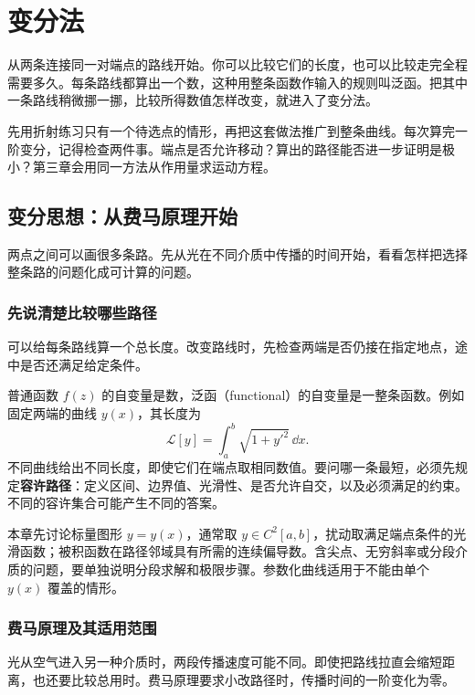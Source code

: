 \chapter{变分法}\label{ch:variation}

\begin{guidebox}
从两条连接同一对端点的路线开始。你可以比较它们的长度，也可以比较走完全程需要多久。每条路线都算出一个数，这种用整条函数作输入的规则叫泛函。把其中一条路线稍微挪一挪，比较所得数值怎样改变，就进入了变分法。

先用折射练习只有一个待选点的情形，再把这套做法推广到整条曲线。每次算完一阶变分，记得检查两件事。端点是否允许移动？算出的路径能否进一步证明是极小？第三章会用同一方法从作用量求运动方程。
\end{guidebox}

\section{变分思想：从费马原理开始}
两点之间可以画很多条路。先从光在不同介质中传播的时间开始，看看怎样把选择整条路的问题化成可计算的问题。

\subsection{先说清楚比较哪些路径}
可以给每条路线算一个总长度。改变路线时，先检查两端是否仍接在指定地点，途中是否还满足给定条件。

普通函数 $f(z)$ 的自变量是数，泛函（functional）的自变量是一整条函数。例如固定两端的曲线 $y(x)$，其长度为
\[
\mathcal L[y]=\int_a^b\sqrt{1+y'^2}\,\dd x.
\]
不同曲线给出不同长度，即使它们在端点取相同数值。要问哪一条最短，必须先规定\textbf{容许路径}：定义区间、边界值、光滑性、是否允许自交，以及必须满足的约束。不同的容许集合可能产生不同的答案。

本章先讨论标量图形 $y=y(x)$，通常取 $y\in C^2[a,b]$，扰动取满足端点条件的光滑函数；被积函数在路径邻域具有所需的连续偏导数。含尖点、无穷斜率或分段介质的问题，要单独说明分段求解和极限步骤。参数化曲线适用于不能由单个 $y(x)$ 覆盖的情形。

\subsection{费马原理及其适用范围}
光从空气进入另一种介质时，两段传播速度可能不同。即使把路线拉直会缩短距离，也还要比较总用时。费马原理要求小改路径时，传播时间的一阶变化为零。

